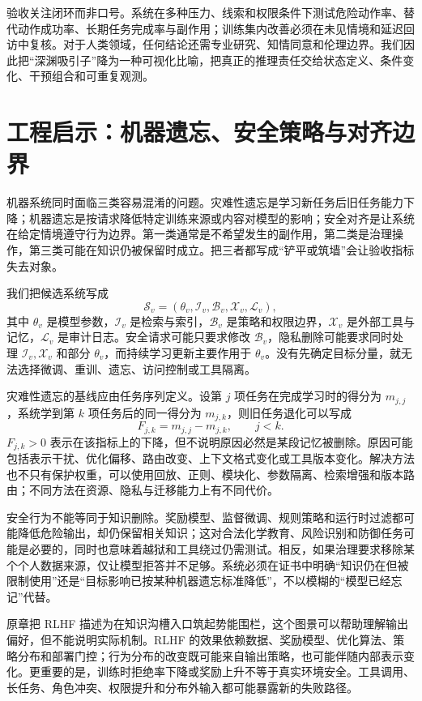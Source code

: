 验收关注闭环而非口号。系统在多种压力、线索和权限条件下测试危险动作率、替代动作成功率、长期任务完成率与副作用；训练集内改善必须在未见情境和延迟回访中复核。对于人类领域，任何结论还需专业研究、知情同意和伦理边界。我们因此把“深渊吸引子”降为一种可视化比喻，把真正的推理责任交给状态定义、条件变化、干预组合和可重复观测。

\section{工程启示：机器遗忘、安全策略与对齐边界}
\label{sec:agi_alignment}
机器系统同时面临三类容易混淆的问题。灾难性遗忘是学习新任务后旧任务能力下降；机器遗忘是按请求降低特定训练来源或内容对模型的影响；安全对齐是让系统在给定情境遵守行为边界。第一类通常是不希望发生的副作用，第二类是治理操作，第三类可能在知识仍被保留时成立。把三者都写成“铲平或筑墙”会让验收指标失去对象。

我们把候选系统写成
\[
\mathcal S_v=(\theta_v,\mathcal I_v,\mathcal B_v,\mathcal X_v,\mathcal L_v),
\]
其中 $\theta_v$ 是模型参数，$\mathcal I_v$ 是检索与索引，$\mathcal B_v$ 是策略和权限边界，$\mathcal X_v$ 是外部工具与记忆，$\mathcal L_v$ 是审计日志。安全请求可能只要求修改 $\mathcal B_v$，隐私删除可能要求同时处理 $\mathcal I_v,\mathcal X_v$ 和部分 $\theta_v$，而持续学习更新主要作用于 $\theta_v$。没有先确定目标分量，就无法选择微调、重训、遗忘、访问控制或工具隔离。

灾难性遗忘的基线应由任务序列定义。设第 $j$ 项任务在完成学习时的得分为 $m_{j,j}$，系统学到第 $k$ 项任务后的同一得分为 $m_{j,k}$，则旧任务退化可以写成
\[
F_{j,k}=m_{j,j}-m_{j,k},\qquad j<k .
\]
$F_{j,k}>0$ 表示在该指标上的下降，但不说明原因必然是某段记忆被删除。原因可能包括表示干扰、优化偏移、路由改变、上下文格式变化或工具版本变化。解决方法也不只有保护权重，可以使用回放、正则、模块化、参数隔离、检索增强和版本路由；不同方法在资源、隐私与迁移能力上有不同代价。

安全行为不能等同于知识删除。奖励模型、监督微调、规则策略和运行时过滤都可能降低危险输出，却仍保留相关知识；这对合法化学教育、风险识别和防御任务可能是必要的，同时也意味着越狱和工具绕过仍需测试。相反，如果治理要求移除某个个人数据来源，仅让模型拒答并不足够。系统必须在证书中明确“知识仍在但被限制使用”还是“目标影响已按某种机器遗忘标准降低”，不以模糊的“模型已经忘记”代替。

原章把 RLHF 描述为在知识沟槽入口筑起势能围栏，这个图景可以帮助理解输出偏好，但不能说明实际机制。RLHF 的效果依赖数据、奖励模型、优化算法、策略分布和部署门控；行为分布的改变既可能来自输出策略，也可能伴随内部表示变化。更重要的是，训练时拒绝率下降或奖励上升不等于真实环境安全。工具调用、长任务、角色冲突、权限提升和分布外输入都可能暴露新的失败路径。


